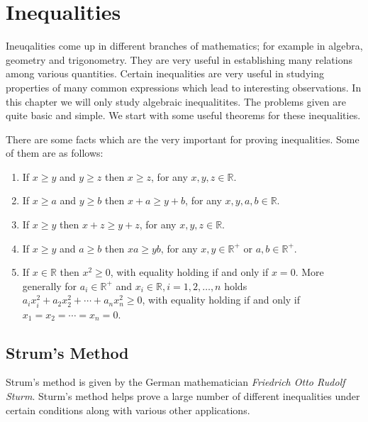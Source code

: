 \chapter{Inequalities}
Ineuqalities come up in different branches of mathematics; for example in algebra, geometry and trigonometry. They are very
useful in establishing many relations among various quantities. Certain inequalities are very useful in studying properties of
many common expressions which lead to interesting observations. In this chapter we will only study algebraic inequalitites. The
problems given are quite basic and simple. We start with some useful theorems for these inequalities.

There are some facts which are the very important for proving inequalities. Some of them are as follows:

\begin{enumerate}
\item If $x\geq y$ and $y\geq z$ then $x\geq z$, for any $x, y, z\in\mathbb{R}$.
\item If $x\geq a$ and $y\geq b$ then $x + a\geq y + b$, for any $x, y, a, b\in\mathbb{R}$.
\item If $x\geq y$ then $x + z\geq y + z$, for any $x, y, z\in\mathbb{R}$.
\item If $x\geq y$ and $a\geq b$ then $xa\geq yb$, for any $x, y\in\mathbb{R}^+$ or $a, b\in\mathbb{R}^+$.
\item If $x\in\mathbb{R}$ then $x^2\geq 0$, with equality holding if and only if $x = 0$. More generally for $a_i\in\mathbb{R}^+$
  and $x_i\in\mathbb{R}, i = 1, 2, \ldots, n$ holds $a_ix_i^2 + a_2x_2^2 + \cdots + a_nx_n^2\geq 0$, with equality holding if and
  only if $x_1 = x_2 = \cdots = x_n = 0$.
\end{enumerate}

\section{Strum's Method}
Strum's method is given by the German mathematician {\sl Friedrich Otto Rudolf Sturm}. Sturm's method helps prove a large number of
different inequalities under certain conditions along with various other applications.

